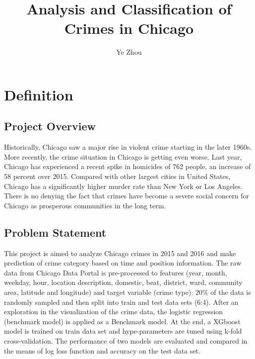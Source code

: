 \documentclass[12pt]{article}
\begin{document}
 
 
\title{Analysis and Classification of Crimes in Chicago}
\author{Ye Zhou}
\maketitle
 
\section{Definition}
\subsection{Project Overview}
Historically, Chicago saw a major rise in violent crime starting in the later 1960s. More recently, the crime situation in Chicago is getting even worse. Last year, Chicago has experienced a recent spike in homicides of 762 people, an increase of 58 percent over 2015. Compared with other largest cities in United States, Chicago has a significantly higher murder rate than New York or Los Angeles. There is no denying the fact that crimes have become a severe social concern for Chicago as prosperous communities in the long term. 
\subsection{Problem Statement}
This project is aimed to analyze Chicago crimes in 2015 and 2016 and make prediction of crime category based on time and position information. The raw data from Chicago Data Portal is pre-processed to features (year, month, weekday, hour, location description, domestic, beat, district, ward, community area, latitude and longitude) and target variable (crime type). $20\%$ of the data is randomly sampled and then split into train and test data sets (6:4). After an exploration in the visualization of the crime data, the logistic regression (benchmark model) is applied as a Benchmark model.  At the end, a XGboost model is trained on train data set and hype-parameters are tuned using k-fold cross-validation. The performance of two models are evaluated and compared in the means of log loss function and accuracy on the test data set.
\end{document}
